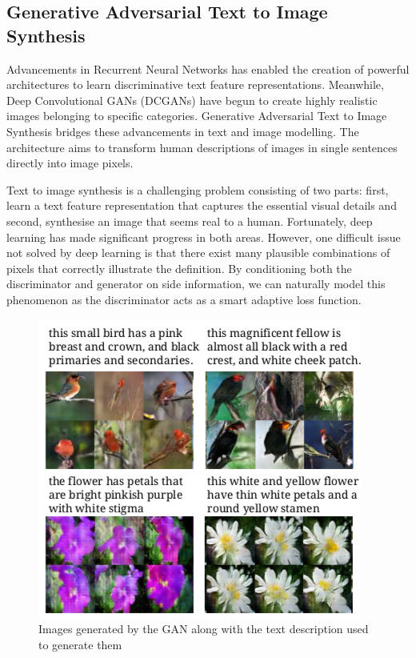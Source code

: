 \begin{onehalfspace}
    \section{Generative Adversarial Text to Image Synthesis}
    Advancements in Recurrent Neural Networks has enabled the creation of 
    powerful architectures to learn discriminative text feature representations. 
    Meanwhile, Deep Convolutional GANs (DCGANs) have begun to create highly 
    realistic images belonging to specific categories. Generative Adversarial 
    Text to Image Synthesis \cite{texttoimagegan} bridges these advancements in 
    text and image modelling. 
    The architecture aims to transform human descriptions of images in single 
    sentences directly into image pixels.

    Text to image synthesis is a challenging problem consisting of two parts: 
    first, learn a text feature representation that captures the essential 
    visual details and second, synthesise an image that seems real to a human. 
    Fortunately, deep learning has made significant progress in both areas. 
    However, one difficult issue not solved by deep learning is that there 
    exist many plausible combinations of pixels that correctly illustrate the 
    definition. By conditioning both the discriminator and generator on side 
    information, we can naturally model this phenomenon as the discriminator 
    acts as a smart adaptive loss function.

    \begin{figure}[h]
        \centering
        \includegraphics[width=0.6\linewidth]{images/texttoimage.png}
        \caption{Images generated by the GAN along with the text description 
        used to generate them \cite{texttoimagegan}}
    \end{figure} 


\end{onehalfspace}
